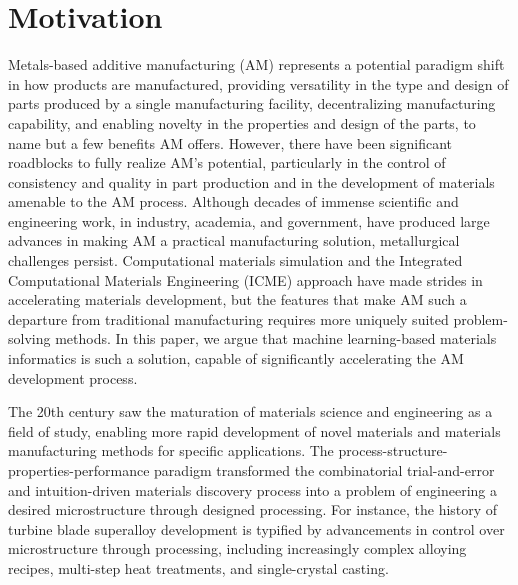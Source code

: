 \section{Motivation}

Metals-based additive manufacturing (AM) represents a potential paradigm shift in how products are manufactured, providing versatility in the type and design of parts produced by a single manufacturing facility, decentralizing manufacturing capability, and enabling novelty in the properties and design of the parts, to name but a few benefits AM offers.
However, there have been significant roadblocks to fully realize AM's potential, particularly in the control of consistency and quality in part production and in the development of materials amenable to the AM process.
Although decades of immense scientific and engineering work, in industry, academia, and government, have produced large advances in making AM a practical manufacturing solution,  metallurgical challenges  persist.
Computational materials simulation and the Integrated Computational Materials Engineering (ICME) approach have made strides in accelerating materials development, but the features that make AM such a departure from traditional manufacturing requires more uniquely suited problem-solving methods.
In this paper, we argue that machine learning-based materials informatics is such a solution, capable of significantly accelerating the AM development process.


The 20th century saw the maturation of materials science and engineering as a field of study, enabling more rapid development of novel materials and materials manufacturing methods for specific applications.
The process-structure-properties-performance paradigm transformed the combinatorial trial-and-error and intuition-driven materials discovery process into a problem of engineering a desired microstructure through designed processing.
For instance, the history of turbine blade superalloy development is typified by advancements in control over microstructure through processing, including increasingly complex alloying recipes, multi-step heat treatments, and single-crystal casting.

